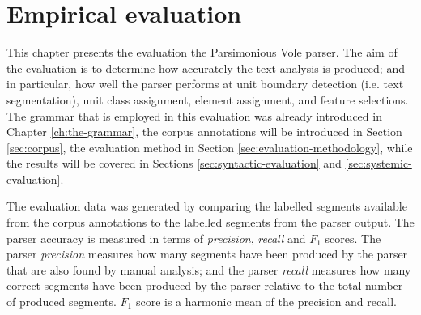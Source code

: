 \chapter{Empirical evaluation}
\label{ch:evaluation}



    This chapter presents the evaluation the Parsimonious Vole parser. The aim of the evaluation is to determine how accurately the text analysis is produced; and in particular, how well the parser performs at unit boundary detection (i.e. text segmentation), unit class assignment, element assignment, and feature selections. The grammar that is employed in this evaluation was already introduced in Chapter \ref{ch:the-grammar}, the corpus annotations will be introduced in Section \ref{sec:corpus}, the evaluation method in Section \ref{sec:evaluation-methodology}, while the results will be covered in Sections  \ref{sec:syntactic-evaluation} and \ref{sec:systemic-evaluation}. 
    
    The evaluation data was generated by comparing the labelled segments  available from the corpus annotations to the labelled segments from the parser output. The parser accuracy is measured in terms of \textit{precision}, \textit{recall} and $F_1$ scores. The parser \textit{precision} measures how many segments have been produced by the parser that are also found by manual analysis; and the parser \textit{recall} measures how many correct segments have been produced by the parser relative to the total number of produced segments. $F_1$ score is a harmonic mean of the precision and recall.
    
